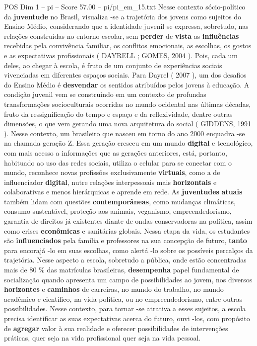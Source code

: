 \begin{textsample}{POS Dim 1 – pi – Score 57.00 – pi/pi\_em\_15.txt}
Nesse contexto sócio-político da \textbf{juventude} no Brasil, visualiza -se a trajetória dos jovens como sujeitos do Ensino Médio, considerando que a identidade juvenil se expressa, sobretudo, nas relações construídas no entorno escolar, sem \textbf{perder} de \textbf{vista} as \textbf{influências} recebidas pela convivência familiar, os conflitos emocionais, as escolhas, os gostos e as expectativas profissionais ( DAYRELL ; GOMES, 2004 ).
Pois, cada um deles, ao chegar à escola, é fruto de um conjunto de experiências sociais vivenciadas em diferentes espaços sociais.
Para Dayrel ( 2007 ), um dos desafios do Ensino Médio é \textbf{desvendar} os sentidos atribuídos pelos jovens à educação.
A condição juvenil vem se construindo em um contexto de profundas transformações socioculturais ocorridas no mundo ocidental nas últimas décadas, fruto da ressignificação do tempo e espaço e da reflexividade, dentre outras dimensões, o que vem gerando uma nova arquitetura do social ( GIDDENS, 1991 ).
Nesse contexto, um brasileiro que nasceu em torno do ano 2000 enquadra -se na chamada geração Z.
Essa geração cresceu em um mundo \textbf{digital} e tecnológico, com mais acesso a informações que as gerações anteriores, está, portanto, habituado ao uso das redes sociais, utiliza o celular para se conectar com o mundo, reconhece novas profissões exclusivamente \textbf{virtuais}, como a de influenciador \textbf{digital}, nutre relações interpessoais mais \textbf{horizontais} e colaborativas e menos hierárquicas e aprende em rede.
As \textbf{juventudes} \textbf{atuais} também lidam com questões \textbf{contemporâneas}, como mudanças climáticas, consumo sustentável, proteção aos animais, veganismo, empreendedorismo, garantia de direitos já existentes diante de ondas conservadoras na política, assim como crises \textbf{econômicas} e sanitárias globais.
Nessa etapa da vida, os estudantes são \textbf{influenciados} pela família e professores na sua concepção de futuro, \textbf{tanto} para encorajá -lo em suas escolhas, como alertá -lo sobre os possíveis percalços da trajetória.
Nesse aspecto a escola, sobretudo a pública, onde estão concentradas mais de 80 \% das matrículas brasileiras, \textbf{desempenha} papel fundamental de socialização quando apresenta um campo de possibilidades ao jovem, nos diversos \textbf{horizontes} e \textbf{caminhos} de carreiras, no mundo do trabalho, no mundo acadêmico e científico, na vida política, ou no empreendedorismo, entre outras possibilidades.
Nesse contexto, para tornar -se atrativa a esses sujeitos, a escola precisa identificar as suas expectativas acerca do futuro, ouvi -los, com propósito de \textbf{agregar} valor à sua realidade e oferecer possibilidades de intervenções práticas, quer seja na vida profissional quer seja na vida pessoal.

\end{textsample}
